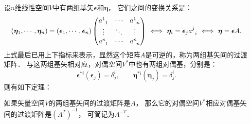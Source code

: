 设$n$维线性空间$V$中有两组基矢$\boldsymbol{\epsilon}$和$\boldsymbol{\eta}$，
它们之间的变换关系是：
\begin{equation*}
    \left(\boldsymbol{\eta}_1,\cdots,\boldsymbol{\eta}_n\right) =
    \left(\boldsymbol{\epsilon}_1,\cdots,\boldsymbol{\epsilon}_n\right)
    \begin{pmatrix}
        a^{1}_{\hphantom{a} 1} & \cdots & a^{1}_{\hphantom{a} n} \\
        \vdots & \ddots & \vdots \\
        a^{n}_{\hphantom{a} 1} & \cdots & a^{n}_{\hphantom{a} n} \\
    \end{pmatrix}  \ \Longleftrightarrow \ 
    \boldsymbol{\eta}_i = \boldsymbol{\epsilon}_j a^{j}_{\hphantom{a} i}
    \  \Longleftrightarrow \ 
    \boldsymbol{\eta} = \boldsymbol{\epsilon} A   .
\end{equation*}
上式最后已用上下指标来表示，显然这个矩阵$A$是可逆的，称为两组基矢间的{\heiti 过渡矩阵}．
与这两组基矢相对应，对偶空间$V^*$中也有两组对偶基，分别是：
\begin{equation}
    \boldsymbol{\epsilon}^{*i}(\boldsymbol{\epsilon}_j) = \delta^i _j , \qquad
    \boldsymbol{\eta}^{*i}(\boldsymbol{\eta}_j) = \delta^i _j .
\end{equation}
则有如下定理：   \index[physwords]{$A^{-T}$表示转置逆}
\begin{theorem}\label{chmla:thm_inv-cov-base}
    如果矢量空间$V$的两组基矢间的过渡矩阵是$A$，
    那么它的对偶空间$V^*$相应对偶基矢间的过渡矩阵是$(A^T)^{-1}$，
    可简记为$A^{-T}$．
\end{theorem}
